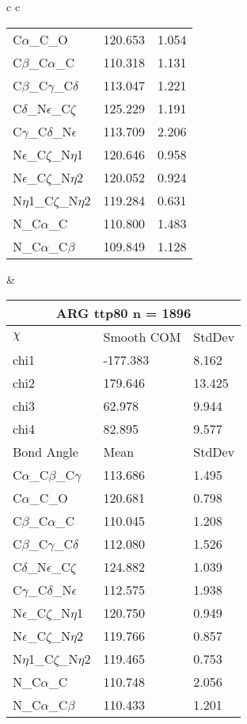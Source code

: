 \begin{longtable}{ c c }
\begin{tabular}{ l l l }
  C$\alpha$\_C\_O & 120.653 & 1.054\\
  C$\beta$\_C$\alpha$\_C & 110.318 & 1.131\\
  C$\beta$\_C$\gamma$\_C$\delta$ & 113.047 & 1.221\\
  C$\delta$\_N$\epsilon$\_C$\zeta$ & 125.229 & 1.191\\
  C$\gamma$\_C$\delta$\_N$\epsilon$ & 113.709 & 2.206\\
  N$\epsilon$\_C$\zeta$\_N$\eta$1 & 120.646 & 0.958\\
  N$\epsilon$\_C$\zeta$\_N$\eta$2 & 120.052 & 0.924\\
  N$\eta$1\_C$\zeta$\_N$\eta$2 & 119.284 & 0.631\\
  N\_C$\alpha$\_C & 110.800 & 1.483\\
  N\_C$\alpha$\_C$\beta$ & 109.849 & 1.128\\
  \bottomrule
  \end{tabular}
  &
  \begin{tabular}{ l l l }
  \toprule
  \multicolumn{3}{c}{ARG \textbf{ttp80} n = 1896} \\ \toprule
  $\chi$       & Smooth COM & StdDev \\ \midrule
  chi1 & -177.383 & 8.162 \\ 
  chi2 & 179.646 & 13.425 \\ 
  chi3 & 62.978 & 9.944 \\ 
  chi4 & 82.895 & 9.577 \\ \midrule
  Bond Angle   & Mean     & StdDev \\ \midrule
  C$\alpha$\_C$\beta$\_C$\gamma$ & 113.686 & 1.495\\
  C$\alpha$\_C\_O & 120.681 & 0.798\\
  C$\beta$\_C$\alpha$\_C & 110.045 & 1.208\\
  C$\beta$\_C$\gamma$\_C$\delta$ & 112.080 & 1.526\\
  C$\delta$\_N$\epsilon$\_C$\zeta$ & 124.882 & 1.039\\
  C$\gamma$\_C$\delta$\_N$\epsilon$ & 112.575 & 1.938\\
  N$\epsilon$\_C$\zeta$\_N$\eta$1 & 120.750 & 0.949\\
  N$\epsilon$\_C$\zeta$\_N$\eta$2 & 119.766 & 0.857\\
  N$\eta$1\_C$\zeta$\_N$\eta$2 & 119.465 & 0.753\\
  N\_C$\alpha$\_C & 110.748 & 2.056\\
  N\_C$\alpha$\_C$\beta$ & 110.433 & 1.201\\
  \bottomrule
  \end{tabular}

\end{longtable}
